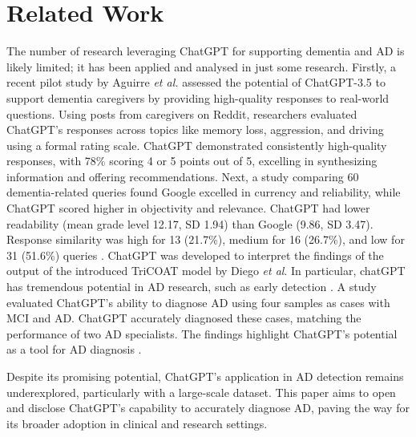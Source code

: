 \section{Related Work}
The number of research leveraging ChatGPT for supporting dementia and AD is likely limited; it has been applied and analysed in just some research. Firstly, a recent pilot study by Aguirre \textit{et al.} \cite{aguirre2024assessing} assessed the potential of ChatGPT-3.5 to support dementia caregivers by providing high-quality responses to real-world questions. Using posts from caregivers on Reddit, researchers evaluated ChatGPT's responses across topics like memory loss, aggression, and driving using a formal rating scale. ChatGPT demonstrated consistently high-quality responses, with 78\% scoring 4 or 5 points out of 5, excelling in synthesizing information and offering recommendations. Next, a study comparing 60 dementia-related queries found Google excelled in currency and reliability, while ChatGPT scored higher in objectivity and relevance. ChatGPT had lower readability (mean grade level 12.17, SD 1.94) than Google (9.86, SD 3.47). Response similarity was high for 13 (21.7\%), medium for 16 (26.7\%), and low for 31 (51.6\%) queries \cite{hristidis2023chatgpt}. ChatGPT was developed to interpret the findings of the output of the introduced TriCOAT model by Diego \textit{et al}. In particular, chatGPT has tremendous potential in AD research, such as early detection \cite{thapaleveraging}. A study evaluated ChatGPT's ability to diagnose AD using four samples as cases with MCI and AD. ChatGPT accurately diagnosed these cases, matching the performance of two AD specialists. The findings highlight ChatGPT’s potential as a tool for AD diagnosis \cite{el2024chatgpt}.

Despite its promising potential, ChatGPT's application in AD detection remains underexplored, particularly with a large-scale dataset. This paper aims to open and disclose ChatGPT's capability to accurately diagnose AD, paving the way for its broader adoption in clinical and research settings.